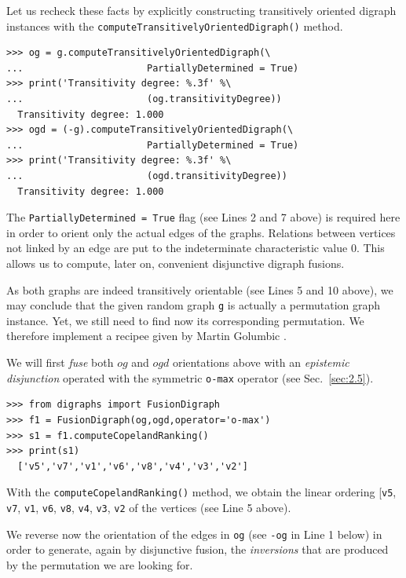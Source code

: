 Let us recheck these facts by explicitly constructing transitively oriented digraph instances with the \texttt{computeTransitivelyOrientedDigraph()} method.
\begin{lstlisting}
>>> og = g.computeTransitivelyOrientedDigraph(\
...                      PartiallyDetermined = True)
>>> print('Transitivity degree: %.3f' %\
...                      (og.transitivityDegree)) 
  Transitivity degree: 1.000
>>> ogd = (-g).computeTransitivelyOrientedDigraph(\
...                      PartiallyDetermined = True)
>>> print('Transitivity degree: %.3f' %\
...                      (ogd.transitivityDegree)) 
  Transitivity degree: 1.000
\end{lstlisting}
The \texttt{PartiallyDetermined = True} flag (see Lines 2 and 7 above) is required here in order to orient only the actual edges of the graphs. Relations between vertices not linked by an edge are put to the indeterminate characteristic value $0$. This allows us to compute, later on, convenient disjunctive digraph fusions.

As both graphs are indeed transitively orientable (see Lines 5 and 10 above), we may conclude that the given random graph \texttt{g} is actually a permutation graph instance. Yet, we still need to find now its corresponding permutation. We therefore implement a recipee given by Martin Golumbic \citep[p. 159]{GOL-2004}.

We will first \emph{fuse} both $og$ and $ogd$ orientations above with an \emph{epistemic disjunction} operated with the symmetric \texttt{o-max} operator (see Sec.~\ref{sec:2.5}).
\begin{lstlisting}
>>> from digraphs import FusionDigraph
>>> f1 = FusionDigraph(og,ogd,operator='o-max')
>>> s1 = f1.computeCopelandRanking()
>>> print(s1)
  ['v5','v7','v1','v6','v8','v4','v3','v2']
\end{lstlisting}
With the \texttt{computeCopelandRanking()} method, we obtain the linear ordering [\texttt{v5}, \texttt{v7}, \texttt{v1}, \texttt{v6}, \texttt{v8}, \texttt{v4}, \texttt{v3}, \texttt{v2} of the vertices (see Line 5 above).

We reverse now the orientation of the edges in \texttt{og} (see \texttt{-og} in Line 1 below) in order to generate, again by disjunctive fusion, the \emph{inversions} that are produced by the permutation we are looking for.

